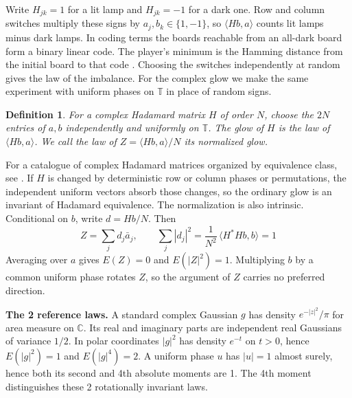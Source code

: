 \documentclass[11pt,a4paper]{article}
\newtheorem{defn}[thm]{Definition}
\theoremstyle{remark}
\begin{document}
Write $H_{jk}=1$ for a lit lamp and $H_{jk}=-1$ for a dark one.
Row and column switches multiply these signs by $a_j,b_k\in\{1,-1\}$,
so $\langle Hb,a\rangle$ counts lit lamps minus dark lamps.
In coding terms the boards reachable from an all-dark board form a binary linear code.
The player's minimum is the Hamming distance from the initial board to that
code \cite{rvi}. Choosing the switches independently at random gives the
law of the imbalance.
For the complex glow we make the same experiment with uniform phases on
$\mathbb T$ in place of random signs.

\begin{samepage}
\begin{defn}
For a complex Hadamard matrix $H$ of order $N$, choose the $2N$ entries of
$a,b$ independently and uniformly on $\mathbb T$. The \emph{glow} of $H$ is the law
of $\langle Hb,a\rangle$. We call the law of $Z=\langle Hb,a\rangle/N$ its normalized glow.
\end{defn}
\end{samepage}

For a catalogue of complex Hadamard matrices organized by equivalence
class, see \cite{tzy}. If $H$ is changed by deterministic row or column phases or permutations,
the independent uniform vectors absorb those changes, so the ordinary
glow is an invariant of Hadamard equivalence. The normalization is also
intrinsic. Conditional on $b$, write $d=Hb/N$. Then
\[
  Z=\sum_j d_j\bar a_j,\qquad
  \sum_j|d_j|^2=\frac1{N^2}\,\langle H^*Hb,b\rangle=1
\]
Averaging over $a$ gives $E(Z)=0$ and $E(|Z|^2)=1$. Multiplying $b$
by a common uniform phase rotates $Z$, so the argument of $Z$ carries no
preferred direction.

\medskip

\noindent\textbf{The 2 reference laws.} 
A standard complex Gaussian $g$ has density $e^{-|z|^2}/\pi$ for area
measure on $\mathbb C$. Its real and imaginary parts are independent real
Gaussians of variance $1/2$. In polar coordinates $|g|^2$ has density
$e^{-t}$ on $t>0$, hence $E(|g|^2)=1$ and $E(|g|^4)=2$. A uniform phase $u$
has $|u|=1$ almost surely, hence both its second and 4th absolute
moments are 1. The 4th moment distinguishes these 2 rotationally
invariant laws.
\end{document}
